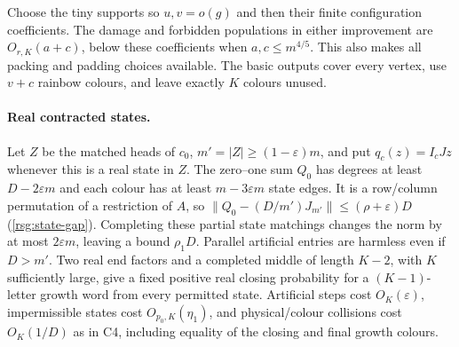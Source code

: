 Choose the tiny supports so $u,v=o(g)$ and then their finite configuration coefficients.  The damage and forbidden populations
in either improvement are $O_{r,K}(a+c)$, below these coefficients when $a,c\le{}m^{4/5}$.  This also makes all packing and padding choices available.  The basic outputs cover every vertex, use $v+c$ rainbow colours, and leave exactly $K$ colours unused.

\paragraph{Real contracted states.}
Let $Z$ be the matched heads of $c_0$, $m'=|Z|\ge(1-\varepsilon)m$, and put $q_c(z)=I_cJz$ whenever this is a real state in $Z$. The zero--one sum $Q_0$ has degrees at least $D-2\varepsilon{}m$ and each colour has at least $m-3\varepsilon{}m$ state edges. It is a row/column permutation of a restriction of $A$, so \label{rsg:state-gap}$\|Q_0-(D/m')J_{m'}\|\le(\rho+\varepsilon)D$ \textup{(\ref{rsg:state-gap})}. Completing these partial state matchings changes the norm by at most $2\varepsilon{}m$, leaving a bound $\rho_1D$.  Parallel artificial entries are harmless even if $D>m'$.  Two real end factors and a completed middle of length $K-2$, with $K$ sufficiently large, give a fixed positive real closing probability for a $(K-1)$-letter growth word from every permitted state.  Artificial steps cost $O_K(\varepsilon)$, impermissible states cost $O_{p_0,K}(\eta_1)$, and physical/colour collisions cost $O_K(1/D)$ as in C4, including equality of the closing and final growth colours.

